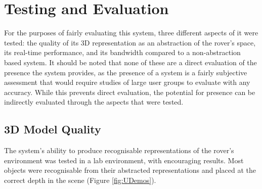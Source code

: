 \chapter{Testing and Evaluation}
\label{chapter:eval}

For the purposes of fairly evaluating this system, three different aspects of it were tested: the quality of its 3D representation as an abstraction of the rover's space, its real-time performance, and its bandwidth compared to a non-abstraction based system. It should be noted that none of these are a direct evaluation of the presence the system provides, as the presence of a system is a fairly subjective assessment that would require studies of large user groups to evaluate with any accuracy. While this prevents direct evaluation, the potential for presence can be indirectly evaluated through the aspects that were tested.

\section{3D Model Quality}

The system's ability to produce recognisable representations of the rover's environment was tested in a lab environment, with encouraging results. Most objects were recognisable from their abstracted representations and placed at the correct depth in the scene (Figure \ref{fig:UDemos}). 

